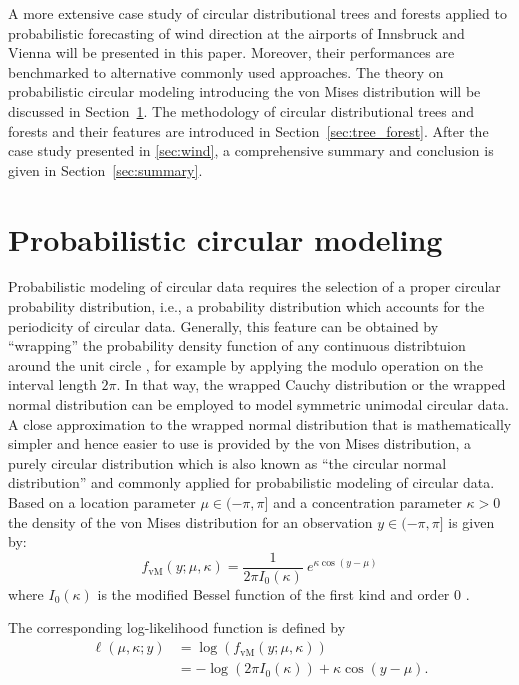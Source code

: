 \documentclass[nojss]{jss}
\numberwithin{equation}{section}
\begin{document}
A more extensive case study of circular distributional trees and forests applied to
probabilistic forecasting of wind direction at the airports of Innsbruck and
Vienna will be presented in this paper. Moreover, their performances are
benchmarked to alternative commonly used approaches.  The theory on
probabilistic circular modeling introducing the von Mises distribution will be
discussed in Section~\ref{sec:prob_circ}. The methodology of circular
distributional trees and forests and their features are introduced in
Section~\ref{sec:tree_forest}.  After the case study presented in
\ref{sec:wind}, a comprehensive summary and conclusion is given in
Section~\ref{sec:summary}.

\section{Probabilistic circular modeling}
\label{sec:prob_circ}
Probabilistic modeling of circular data requires the selection of a proper circular
probability distribution, i.e., a probability distribution which accounts for the periodicity
of circular data.
Generally, this feature can be obtained by ``wrapping'' the probability density function
of any continuous distribtuion around the unit circle \citep{Mardia+Jupp:2009}, for example by
applying the modulo operation on the interval length $2\pi$.
In that way, the wrapped Cauchy distribution or the wrapped normal distribution can be employed to model symmetric unimodal circular data.
A close approximation to the wrapped normal distribution that is mathematically simpler and hence easier 
to use \citep{Fisher:1993} is provided by the von Mises distribution,
a purely circular distribution which is also known as ``the circular normal distribution''
and commonly applied for probabilistic modeling of circular data.
Based on a location parameter $\mu \in (-\pi, \pi]$ and a concentration parameter $\kappa > 0$ 
the density of the von Mises distribution for an observation $y \in (-\pi, \pi]$ is given by:
\begin{equation}
  f_\mathrm{vM}(y; \mu, \kappa) = \frac{1}{2 \pi I_0(\kappa)}~e^{ \kappa \cos(y - \mu)}\label{schlosser:equ_vm}
\end{equation}
where $I_0(\kappa)$ is the modified Bessel function of the first kind and order $0$
\citep[see, e.g.,][for a more detailed overview]{Jammalamadaka+Sengupta:2001}.

The corresponding log-likelihood function is defined by
\begin{equation}
\begin{aligned}
\ell(\mu, \kappa; y) &= \log(f_\mathrm{vM}(y;\mu, \kappa)) \\
&= -\log(2 \pi I_0(\kappa)) +  \kappa \cos(y - \mu).\label{equ:vM:loglik}
\end{aligned}
\end{equation}
\end{document}
